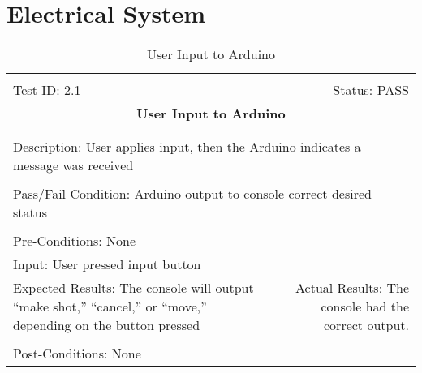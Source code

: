 \documentclass[titlepage]{article}
\begin{document}
\section{Electrical System}
\begin{center}
\begin{table}[h!]
\begin{tabular}{|l r|}\hline&\\[-2mm]
	Test ID: 2.1	&Status: PASS\\[-3mm]
	\multicolumn{2}{|c|}{\textbf{\large{User Input to Arduino}}}\\&\\\hline&\\[-3mm]
	\multicolumn{2}{|p{\textwidth}|}{Description: User applies input, then the Arduino indicates a message was received}\\[1mm]\hline&\\[-3mm]
	\multicolumn{2}{|p{\textwidth}|}{Pass/Fail Condition: Arduino output to console correct desired status}\\[1mm]\hline&\\[-3mm]
	\multicolumn{2}{|p{\textwidth}|}{Pre-Conditions: None}\\[4mm]
	\multicolumn{2}{|p{\textwidth}|}{Input: User pressed input button}\\[2mm]\hline
	\multicolumn{1}{|p{0.49\textwidth}}{Expected Results: The console will output ``make shot,'' ``cancel,'' or ``move,'' depending on the button pressed}	&\multicolumn{1}{|p{0.45\textwidth}|}{Actual Results: The console had the correct output.}\\\hline&\\[-3mm]
	\multicolumn{2}{|p{\textwidth}|}{Post-Conditions: None}\\\hline
\end{tabular}
\caption{User Input to Arduino}
\end{table}
\end{center}
\end{document}
